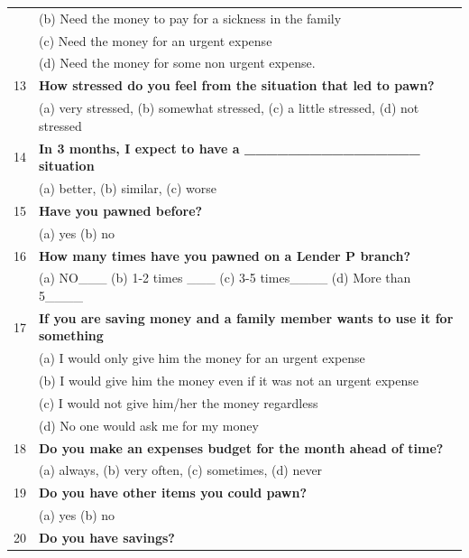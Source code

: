 \begin{tabular}{cl}
      & (b) Need the money to pay for a sickness in the family \\
      & (c) Need the money for an urgent expense \\
      & (d) Need the money for some non urgent expense. \\
\rowcolor[rgb]{ .682,  .667,  .667} 13    & \textbf{How stressed do you feel from the situation that led to pawn?} \\
      & (a) very stressed, (b) somewhat stressed, (c) a little stressed, (d) not stressed  \\
\rowcolor[rgb]{ .682,  .667,  .667} 14    & \textbf{In 3 months, I expect to have a  \_\_\_\_\_\_\_\_\_\_\_\_\_\_\_\_ situation} \\
      & (a) better, (b) similar,  (c) worse \\
\rowcolor[rgb]{ .682,  .667,  .667} 15    & \textbf{Have you pawned before?} \\
      & (a) yes  (b) no \\
\rowcolor[rgb]{ .682,  .667,  .667} 16    & \textbf{How many times have you pawned on a Lender P branch?} \\
      & (a) NO\_\_\_    (b)  1-2 times \_\_\_    (c) 3-5 times\_\_\_\_   (d) More than 5\_\_\_\_ \\
\rowcolor[rgb]{ .682,  .667,  .667} 17    & \multicolumn{1}{p{54.91em}}{\textbf{If you are saving money and a family member wants to use it for something }} \\
      & \multicolumn{1}{p{54.91em}}{(a) I would only give him the money for an urgent expense} \\
      & \multicolumn{1}{p{54.91em}}{(b) I would give him the money even if it was not an urgent expense} \\
      & \multicolumn{1}{p{54.91em}}{(c) I would not give him/her the money regardless} \\
      & \multicolumn{1}{p{54.91em}}{(d) No one would ask me for my money} \\
\rowcolor[rgb]{ .682,  .667,  .667} 18    & \textbf{Do you make an expenses budget for the month ahead of time?} \\
      & (a) always, (b) very often, (c) sometimes, (d) never \\
19    & \multicolumn{1}{p{54.91em}}{\textbf{Do you have other items you could pawn?}} \\
      & (a) yes  (b) no \\
\rowcolor[rgb]{ .682,  .667,  .667} 20    & \textbf{Do you have savings?} \\

\end{tabular}

